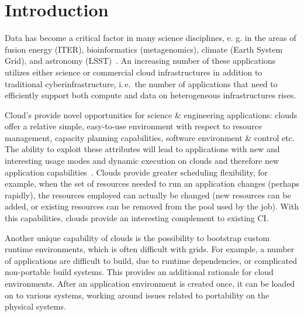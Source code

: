 \documentclass[times]{cpeauth}
\begin{document}

\maketitle


\vspace{-6pt}

\section{Introduction}
\vspace{-2pt}

Data has become a critical factor in many science disciplines, e. g. in the 
areas of fusion energy (ITER), bioinformatics (metagenomics), climate (Earth 
System Grid), and astronomy (LSST)~\cite{Jha:2011fk}. An increasing number of 
these applications utilizes either science or commercial cloud infrastructures 
in addition to traditional cyberinfrastructure, i.\,e.\ the number of 
applications that need to efficiently support both compute and data on 
heterogeneous infrastructures rises.

Cloud's provide novel opportunities for science \& engineering applications:
clouds offer a relative simple, easy-to-use environment with respect to
resource management, capacity planning capabilities, software environment \&
control etc. The ability to exploit these attributes will lead to applications
with new and interesting usage modes and dynamic execution on clouds and
therefore new application capabilities~\cite{Jha:2010kx, fourthparadigm}.
Clouds provide greater scheduling flexibility, for example, when the set of
resources needed to run an application changes (perhaps rapidly), the
resources employed can actually be changed (new resources can be added, or
existing resources can be removed from the pool used by the job). With this 
capabilities, clouds provide an interesting complement to existing CI. 

Another unique capability of clouds is the possibility to bootstrap custom
runtime environments, which is often difficult with grids. For example, a
number of applications are difficult to build, due to runtime dependencies, or
complicated non-portable build systems. This provides an additional rationale
for cloud environments. After an application environment is created once, it
can be loaded on to various systems, working around issues related to
portability on the physical systems.
\end{document}

